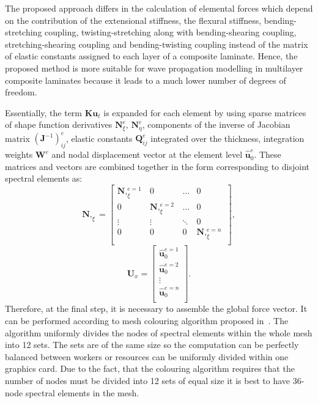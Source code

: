 \documentclass[runningheads]{llncs}
\renewcommand{\vec}[1]{\mathbf{#1}}
\newcommand{\bm}[1]{\mathbf{#1}}
\begin{document}
The proposed approach differs in the calculation of elemental forces which depend on the contribution of the extensional stiffness, the flexural stiffness, bending-stretching coupling,  twisting-stretching along with bending-shearing coupling, stre\-tching-shearing coupling and bending-twisting coupling instead of the matrix of elastic constants assigned to each layer of a composite laminate. 
Hence, the proposed method is more suitable for wave propagation modelling in multilayer composite laminates because it leads to a much lower number of degrees of freedom. 

Essentially, the term \(\bm{K}\vec{u}_t\) is expanded for each element by using sparse matrices of shape function derivatives \(\bm{N}_{\xi}^e,\,\bm{N}_{\eta}^e\), components of the inverse of Jacobian matrix \((\vec{J}^{-1})_{ij}^e\), elastic constants \(\vec{Q}_{ij}^e\) integrated over the thickness, integration weights \(\vec{W}^e\) and nodal displacement vector at the element level \(\hat{\vec{u}}_0^{e} \). 
These matrices and vectors are combined together in the form corresponding to disjoint spectral elements as:
\begin{equation}
\bm{N},_{\xi} = \left[
\begin{array}{cccc}  
\bm{N},_{\xi}^{e=1} & 0 & \ldots & 0\\[2pt]
0& \bm{N},_{\xi}^{e=2}  & \ldots& 0\\[2pt]
\vdots&\vdots&\ddots&0\\[2pt]
0& 0 &0&\bm{N},_{\xi}^{e=n}\\[2pt]
\end{array}\right],
\end{equation}
\begin{equation}
\vec{U}_x = \left[
\begin{array}{c}  
\hat{\vec{u}}_0^{e=1}  \\[2pt]
\hat{\vec{u}}_0^{e=2} \\[2pt]
\vdots\\[2pt]
\hat{\vec{u}}_0^{e=n}\\[2pt]
\end{array}\right].
\end{equation}
Therefore, at the final step, it is necessary to assemble the global force vector. 
It can be performed according to mesh colouring algorithm proposed in~\cite{Kudela2016}. 
The algorithm uniformly divides the nodes of spectral elements within the whole mesh into 12 sets. 
The sets are of the same size so the computation can be perfectly balanced between workers or resources can be uniformly divided within one graphics card.
Due to the fact, that the colouring algorithm requires that the number of nodes must be divided into 12 sets of equal size it is best to have 36-node spectral elements in the mesh.
\end{document}
